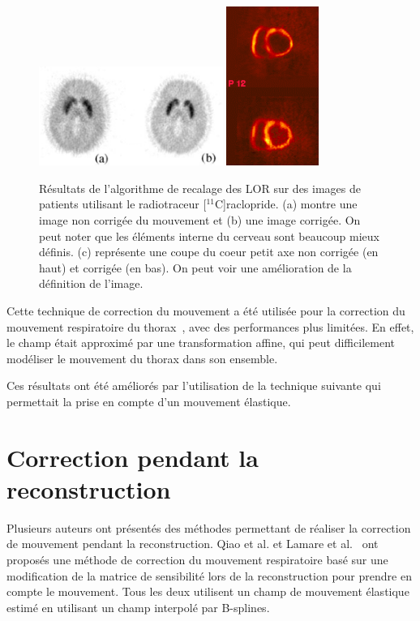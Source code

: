 \begin{figure}[h!]
	\begin{center}
		\includegraphics[width=6cm]{images/bloomfield2003design} \includegraphics[width=3cm]{images/livieratos2005rigid}
	\end{center}
	\caption{Résultats de l'algorithme de recalage des LOR sur des images de patients utilisant le radiotraceur [$^{11}$C]raclopride. (a) montre une image non corrigée du mouvement et (b) une image corrigée. On peut noter que les éléments interne du cerveau sont beaucoup mieux définis. (c) représente une coupe du coeur petit axe non corrigée (en haut) et corrigée (en bas). On peut voir une amélioration de la définition de l'image.} 
	\label{fig:ameliorationLOR}
\end{figure}

Cette technique de correction du mouvement a été utilisée pour la correction du mouvement respiratoire du thorax~\cite{lamare2007respiratory,lamare2007list}, avec des performances plus limitées. En effet, le champ était approximé par une transformation affine, qui peut difficilement modéliser le mouvement du thorax dans son ensemble.

Ces résultats ont été améliorés par l'utilisation de la technique suivante qui permettait la prise en compte d'un mouvement élastique.

\section{Correction pendant la reconstruction}

Plusieurs auteurs ont présentés des méthodes permettant de réaliser la correction de mouvement pendant la reconstruction. Qiao et al.\cite{qiao2006motion} et Lamare et al.~\cite{lamare2007list} ont proposés une méthode de correction du mouvement respiratoire basé sur une modification de la matrice de sensibilité lors de la reconstruction pour prendre en compte le mouvement. Tous les deux utilisent un champ de mouvement élastique estimé en utilisant un champ interpolé par B-splines.

